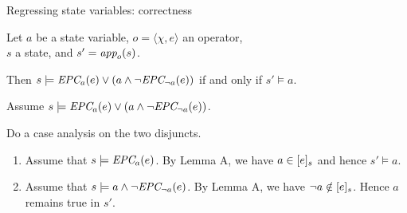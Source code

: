 \documentclass{gkibeamer}
\begin{document}
\begin{frame}{Regressing state variables: correctness}
  \begin{lemma}[B]
    Let $a$ be a state variable, $o = \langle \chi, e\rangle$
    an operator, \\
    $s$ a state, and $s' = \textit{app}_{o}(s)$.

    Then $s \models \textit{EPC}_{a}(e) \lor (a \land \neg \textit{EPC}_{\neg
      a}(e))$ if and only if $s'\models a$.
  \end{lemma}

  \pause

  \begin{proofstart}
    \hilite{$(\Rightarrow)$:} Assume $s \models \textit{EPC}_{a}(e) \lor (a
    \land \neg \textit{EPC}_{\neg a}(e))$.

    Do a case analysis on the two disjuncts.
    \pause

    \begin{enumerate}
    \item Assume that $s \models \textit{EPC}_{a}(e)$.
      By Lemma A, we have $a \in \lbrack e\rbrack_{s}$ and hence $s' \models
      a$.
      \pause
    \item Assume that $s \models a \land \neg \textit{EPC}_{\neg a}(e)$.
      By Lemma A, we have $\neg a \notin \lbrack e\rbrack_{s}$.
      Hence $a$ remains true in $s'$.
    \end{enumerate}
  \end{proofstart}
\end{frame}
\end{document}
